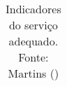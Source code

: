 \begin{table}[H]
{\begin{tabular}{ccccc}
\end{tabular}%
}
\caption{Indicadores do serviço adequado. Fonte: Martins (\citeyear{MARTINS})}
\label{cotran-table}
\end{table}